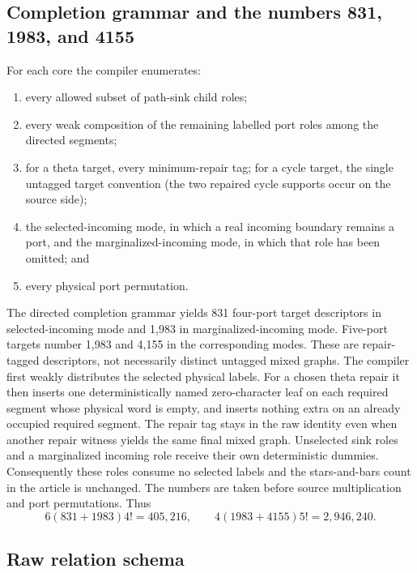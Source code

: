 \documentclass[11pt]{article}
\theoremstyle{remark}
\begin{document}
\subsection{Completion grammar and the numbers 831, 1983, and 4155}

For each core the compiler enumerates:
\begin{enumerate}[label=(\roman*)]
  \item every allowed subset of path-sink child roles;
  \item every weak composition of the remaining labelled port roles among the
        directed segments;
  \item for a theta target, every minimum-repair tag; for a cycle target,
        the single untagged target convention (the two repaired cycle supports
        occur on the source side);
  \item the selected-incoming mode, in which a real incoming boundary remains
        a port, and the marginalized-incoming mode, in which that role has
        been omitted; and
  \item every physical port permutation.
\end{enumerate}

The directed completion grammar yields 831 four-port target descriptors in
selected-incoming mode and 1,983 in marginalized-incoming mode.  Five-port
targets number 1,983 and 4,155 in the corresponding modes.  These are
repair-tagged descriptors, not necessarily distinct untagged mixed graphs.
The compiler first weakly distributes the selected physical labels.  For a
chosen theta repair it then inserts one deterministically named zero-character
leaf on each required segment whose physical word is empty, and inserts
nothing extra on an already occupied required segment.  The repair tag stays
in the raw identity even when another repair witness yields the same final
mixed graph.  Unselected sink roles and a marginalized incoming role receive
their own deterministic dummies.  Consequently these roles consume no
selected labels and the stars-and-bars count in the article is unchanged.
The numbers are taken before source multiplication and port permutations.
Thus
\[
 6(831+1983)4!=405{,}216,\qquad
 4(1983+4155)5!=2{,}946{,}240.
\]

\subsection{Raw relation schema}
\end{document}
